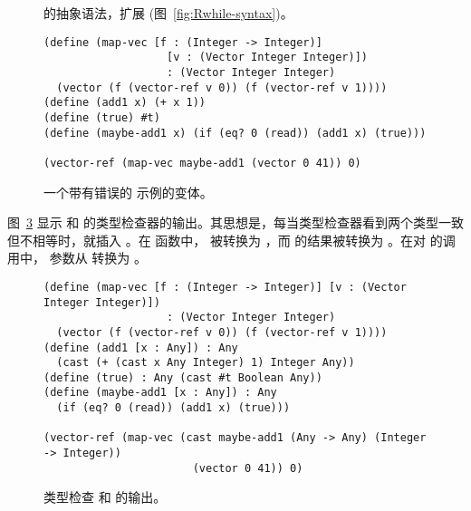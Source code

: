 \documentclass[11pt]{book}
\newcommand{\gray}[1]{{\color{gray} #1}}
\begin{document}
\begin{figure}[tp]
\centering
\fbox{
\begin{minipage}{0.96\textwidth}
\small
\[
\begin{array}{lcl}
  \Exp &::=& \ldots \mid \CAST{\Exp}{\Type}{\Type} \\
  \LangCast{} &::=& \gray{ \PROGRAMDEFSEXP{\code{'()}}{\LP\Def\ldots\RP}{\Exp} }
\end{array}
\]
\end{minipage}
}
\caption{ \LangCast{} 的抽象语法，扩展 \LangLoop{} (图~\ref{fig:Rwhile-syntax})。}
\label{fig:Rgrad-prime-syntax}
\end{figure}


\begin{figure}[tbp]
\begin{lstlisting}
(define (map-vec [f : (Integer -> Integer)]
                   [v : (Vector Integer Integer)])
                   : (Vector Integer Integer)
  (vector (f (vector-ref v 0)) (f (vector-ref v 1))))
(define (add1 x) (+ x 1))
(define (true) #t)
(define (maybe-add1 x) (if (eq? 0 (read)) (add1 x) (true)))

(vector-ref (map-vec maybe-add1 (vector 0 41)) 0)
\end{lstlisting}
\caption{一个带有错误的  示例的变体。}
\label{fig:map-vec-maybe-add1}
\end{figure}

图~\ref{fig:map-vec-cast} 显示
 和  的类型检查器的输出。其思想是，每当类型检查器看到两个类型一致但不相等时，就插入  。在  函数中，  被转换为  ，而 \code{+} 的结果被转换为
 。在对  的调用中，  参数从  转换为  。

\begin{figure}[btp]
\begin{lstlisting}[basicstyle=\ttfamily\footnotesize]
(define (map-vec [f : (Integer -> Integer)] [v : (Vector Integer Integer)])
                   : (Vector Integer Integer)
  (vector (f (vector-ref v 0)) (f (vector-ref v 1))))
(define (add1 [x : Any]) : Any
  (cast (+ (cast x Any Integer) 1) Integer Any))
(define (true) : Any (cast #t Boolean Any))
(define (maybe-add1 [x : Any]) : Any
  (if (eq? 0 (read)) (add1 x) (true)))

(vector-ref (map-vec (cast maybe-add1 (Any -> Any) (Integer -> Integer))
                       (vector 0 41)) 0)
\end{lstlisting}
\caption{类型检查  和  的输出。}
\label{fig:map-vec-cast}
\end{figure}
\end{document}
